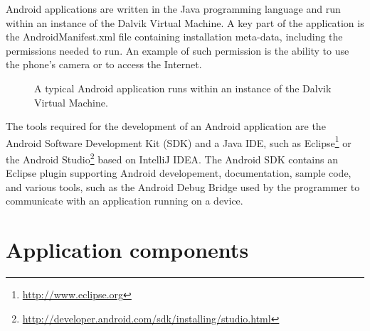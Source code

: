 Android applications are written in the Java programming language and run within an instance of the Dalvik Virtual Machine.
A key part of the application is the AndroidManifest\@.xml file containing installation meta-data, including the permissions needed to run.
An example of such permission is the ability to use the phone's camera or to access the Internet.
\begin{figure}[h!]
    \caption{A typical Android application runs within an instance of the Dalvik Virtual Machine.}
\end{figure}

The tools required for the development of an Android application are the Android Software Development Kit (SDK) and a Java IDE, such as Eclipse\footnote{\url{http://www.eclipse.org}} or the Android Studio\footnote{\url{http://developer.android.com/sdk/installing/studio.html}} based on IntelliJ IDEA. 
The Android SDK contains an Eclipse plugin supporting Android developement, documentation, sample code, and various tools, such as the Android Debug Bridge used by the programmer to communicate with an application running on a device. 


\section{Application components}

